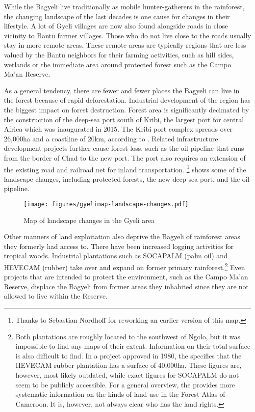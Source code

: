 While the Bagyeli live traditionally as mobile hunter-gatherers in the rainforest, the changing landscape of the last decades is one cause for changes in their lifestyle. A lot of Gyeli villages are now also found alongside roads in close vicinity to Bantu farmer villages. Those who do not live close to the roads usually stay in more remote areas. These remote areas are typically regions that are less valued by the Bantu neighbors for their farming activities, such as hill sides, wetlands or the immediate area around protected forest such as the Campo Ma'an Reserve. 

As a general tendency, there are fewer and fewer places the Bagyeli can live in the forest because of rapid deforestation. Industrial development of the region has the biggest impact on forest destruction. Forest area is significantly decimated by the construction of the deep-sea port south of Kribi, the largest port for central Africa which was inaugurated in 2015. The Kribi port complex spreads over 26,000ha and a coastline of 20km, according to \citet{ntaryike2015}.  Related infrastructure development projects further cause forest loss, such as the oil pipeline that runs from the border of Chad to the new port. The port also requires an extension of the existing road and railroad net for inland transportation. \footnote{Thanks to Sebastian Nordhoff for reworking an earlier version of this map.} shows some of the landscape  changes, including protected forests, the new deep-sea port, and the oil pipeline.

\begin{figure}
\texttt{[image: figures/gyelimap-landscape-changes.pdf]}
\caption{Map of landscape changes in the Gyeli area}
\label{Fig:Gyeli-env}
\end{figure}

\newpage
Other manners of land exploitation also deprive the Bagyeli of rainforest areas they formerly had access to. 
There have been increased logging activities for tropical woods. Industrial plantations such as SOCAPALM (palm oil) and  HEVECAM (rubber) take over and expand on former primary rainforest.\footnote{Both plantations are roughly located to the southwest of Ngolo, but it was impossible to find any maps of their extent. Information on their total surface is also difficult to find. In a project approved in 1980, the \citet{worldbank2015} specifies that the HEVECAM rubber plantation has a surface of 40,000ha. These figures are, however, most likely outdated, while exact figures for SOCAPALM do not seem to be publicly accessible. For a general overview, the \citet{worldres2015} provides more systematic information on the kinds of land use in the Forest Atlas of Cameroon. It is, however, not always clear who has the land rights.} Even projects that are intended to protect the environment, such as the Campo Ma'an Reserve, displace the Bagyeli from former areas they inhabited since they are not allowed to live within the Reserve.

